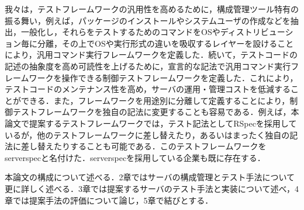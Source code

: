 我々は，テストフレームワークの汎用性を高めるために，構成管理ツール特有の振る舞い，例えば，パッケージのインストールやシステムユーザの作成などを抽出，一般化し，それらをテストするためのコマンドをOSやディストリビューション毎に分離，その上でOSや実行形式の違いを吸収するレイヤーを設けることにより，汎用コマンド実行フレームワークを定義した．続いて，テストコードの記述の抽象度を高め可読性を上げるために，宣言的な記法で汎用コマンド実行フレームワークを操作できる制御テストフレームワークを定義した．これにより，テストコードのメンテナンス性を高め，サーバの運用・管理コストを低減することができる．また，フレームワークを用途別に分離して定義することにより，制御テストフレームワークを独自の記法に変更することも容易である．例えば，本論文で提案するテストフレームワークでは，テスト記法としてRSpec\cite{rspec}を採用しているが，他のテストフレームワークに差し替えたり，あるいはまったく独自の記法に差し替えたりすることも可能である．このテストフレームワークをserverspec\cite{serverspec}と名付けた．serverspecを採用している企業も既に存在する\cite{nintendo}\cite{wantedly}．

本論文の構成について述べる．2章ではサーバの構成管理とテスト手法について更に詳しく述べる．3章では提案するサーバのテスト手法と実装について述べ，4章では提案手法の評価について論じ，5章で結びとする．

